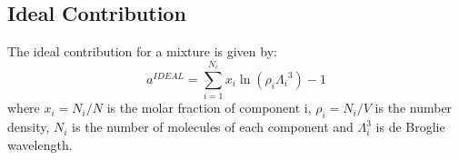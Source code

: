 \subsection{Ideal Contribution}

The ideal contribution for a mixture is given by:
\begin{equation}
a^{IDEAL} = \sum_{i=1}^{N_{c}} x_{i}\ln{(\rho_{i}{\Lambda_{i}}^3)} -1
\label{eqn:aideal}
\end{equation}
where $x_{i}=N_{i}/N$ is the molar fraction of component i, $\rho_{i}=N_{i}/V$ is the number density, $N_{i}$ is the number of molecules of each component and $\Lambda_{i}^3$ is de Broglie wavelength. 

